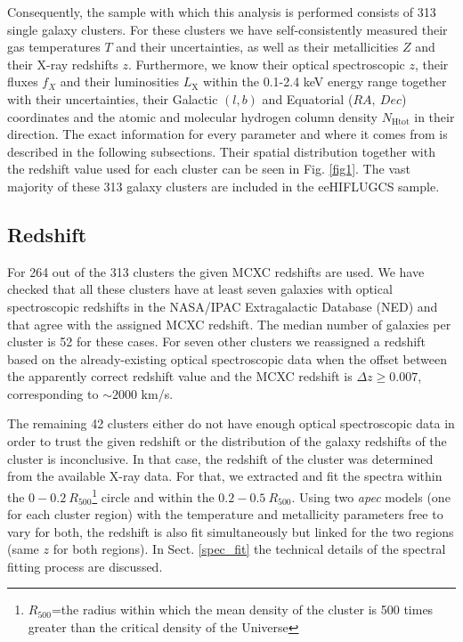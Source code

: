 \documentclass{aa}   %
\begin{document}
Consequently, the sample with which this analysis is performed consists of 313 single galaxy clusters. For these clusters we have self-consistently measured their gas temperatures $T$ and their uncertainties, as well as their metallicities $Z$ and their X-ray redshifts $z$. Furthermore, we know their optical spectroscopic $z$, their fluxes $f_X$ and their luminosities $L_{\text{X}}$ within the 0.1-2.4 keV energy range together with their uncertainties, their Galactic $(l,b)$ and Equatorial ($RA,\ Dec$) coordinates and the atomic and molecular hydrogen column density $N_{\text{Htot}}$ in their direction. The exact information for every parameter and where it comes from is described in the following subsections. Their spatial distribution together with the redshift value used for each cluster can be seen in Fig. \ref{fig1}. The vast majority of these 313 galaxy clusters are included in the eeHIFLUGCS sample. 

\subsection{Redshift} \label{redshifts}

For 264 out of the 313 clusters the given MCXC redshifts are used. We have checked that all these clusters have at least seven galaxies with optical spectroscopic redshifts in the NASA/IPAC Extragalactic Database (NED) and that agree with the assigned MCXC redshift. The median number of galaxies per cluster is 52 for these cases. For seven other clusters we reassigned a redshift based on the already-existing optical spectroscopic data when the offset between the apparently correct redshift value and the MCXC redshift is $\Delta z \geq 0.007$, corresponding to $\sim 2000$ km/s. 

The remaining 42 clusters either do not have enough optical spectroscopic data in order to trust the given redshift or the distribution of the galaxy redshifts of the cluster is inconclusive. In that case, the redshift of the cluster was determined from the available X-ray data. For that, we extracted and fit the spectra within the $0-0.2\ R_{500}$\footnote{$R_{500}$=the radius within which the mean density of the cluster is 500 times greater than the critical density of the Universe} circle and within the $0.2-0.5\ R_{500}$. Using two \textit{apec} models (one for each cluster region) with the temperature and metallicity parameters free to vary for both, the redshift is also fit simultaneously but linked for the two regions (same $z$ for both regions). In Sect. \ref{spec_fit} the technical details of the spectral fitting process are discussed.
\end{document}

